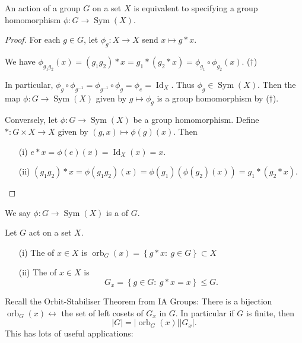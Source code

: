 \documentclass[egregdoesnotlikesansseriftitles,a4paper]{scrartcl}
\begin{document}
\begin{proposition}
     An action of a group $G$ on a set $X$ is equivalent to specifying a group homomorphism $\phi: G \rightarrow \operatorname{Sym}(X)$.
     \begin{proof}
      For each $g \in G$, let $\phi_{g}: X \rightarrow X$ send $x \mapsto g \ast x$. 

      We have $\phi_{g_1 g_2 }(x)=(g_1 g_2 )\ast x=g_1 \ast (g_2 \ast x)=\phi_{g_1 }\circ \phi_{g_2 }(x)$. ($\dagger$)

      In particular, $\phi_{g}\circ \phi_{{g}^{-1}}=\phi_{{g}^{-1}}\circ \phi_{g}=\phi_{e}=\operatorname{Id}_X$. Thus $\phi_{g} \in \operatorname{Sym}(X)$. Then the map $\phi: G \rightarrow \operatorname{Sym}(X)$ given by $g \mapsto \phi_{g}$ is a group homomorphism by ($\dagger$).

      Conversely, let $\phi: G \rightarrow \operatorname{Sym}(X)$ be a group homomorphism. Define $\ast: G \times X \rightarrow X$ given by $(g,x) \mapsto \phi (g)(x)$. Then
      \begin{itemize}
           \item[(i)] $e \ast x=\phi (e)(x)=\operatorname{Id}_X (x)=x$.
           \item[(ii)] $(g_1 g_2 )\ast x= \phi (g_1 g_2 )(x)=\phi (g_1 )(\phi (g_2)(x))=g_1 \ast (g_2 \ast x)$. 
      \end{itemize}
\end{proof}
\begin{definition*}
      We say $\phi: G \rightarrow \operatorname{Sym}(X)$ is a  of $G$.
\end{definition*}
\end{proposition}
\begin{definition*}
     Let $G$ act on a set $X$. 
     \begin{itemize}
          \item[(i)] The  of $x \in X$ is $\operatorname{orb}_G (x)=\left\{g \ast x: \ g \in G\right\} \subset X$
          \item[(ii)] The  of $x \in X$ is \[
          G_{x}=\left\{g \in G: \ g \ast x=x\right\} \leq G
          .\] 
     \end{itemize}
\end{definition*}
Recall the Orbit-Stabiliser Theorem from IA Groups: There is a bijection $\operatorname{orb}_G (x) \leftrightarrow $ the set of left cosets of $G_{x}$ in $G$. In particular if $G$ is finite, then \[
|G|=|\operatorname{orb}_G (x)| |G_{x}|
.\] This has lots of useful applications:
\end{document}
